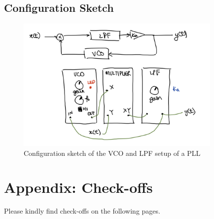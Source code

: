 \documentclass[11pt]{article}
\begin{document}
\subsection*{Configuration Sketch}
\begin{figure}[H]
    \centering
    \includegraphics[width=10cm]{W3Q6Config.jpeg}
    \caption{Configuration sketch of the VCO and LPF setup of a PLL}
    \label{fig:W3Q6Config}
\end{figure}

\section*{Appendix: Check-offs}
Please kindly find check-offs on the following pages.

\end{document}
